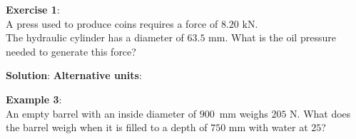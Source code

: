 \documentclass[10pt]{amsart}
\begin{document}
\begin{minipage}[t]{0.45\textwidth}
	\raggedright
	\textbf{Exercise 1}:\\
		A press used to produce coins requires a force of $8.20\text{ kN}$.\\
		The hydraulic cylinder has
		a diameter of $63.5\text{ mm}$. \parb
		What is the oil pressure needed to generate this force?
	\par\vspace{3.25cm}
\end{minipage}
\hfill
\begin{minipage}[t]{0.5\textwidth}
	\textbf{Solution}:
	\parm
	\parm
	\textbf{Alternative units}:
	\parm
\end{minipage}
\vfill
\newpage
\begin{minipage}[t]{0.4\textwidth}
\raggedright
\textbf{Example 3}:\\
An empty barrel with an inside diameter of $900$~mm weighs $205$ N. \parb
What does the barrel weigh when it is filled to a depth of $750$ mm
with water at $25$\textcelsius{}?
\par\vspace{9cm}
\end{minipage}
\hfill
\end{document}
